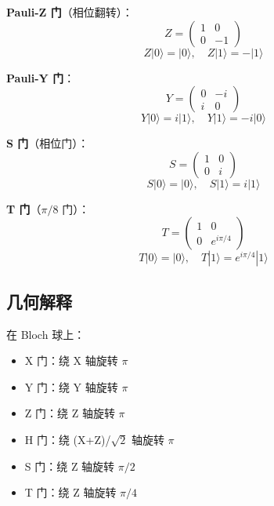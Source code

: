 \documentclass[12pt,a4paper]{article}
\begin{document}
\textbf{Pauli-Z 门}（相位翻转）：
\begin{equation}
Z = \begin{pmatrix} 1 & 0 \\ 0 & -1 \end{pmatrix}
\end{equation}
\begin{equation}
Z|0\rangle = |0\rangle, \quad Z|1\rangle = -|1\rangle
\end{equation}

\textbf{Pauli-Y 门}：
\begin{equation}
Y = \begin{pmatrix} 0 & -i \\ i & 0 \end{pmatrix}
\end{equation}
\begin{equation}
Y|0\rangle = i|1\rangle, \quad Y|1\rangle = -i|0\rangle
\end{equation}

\textbf{S 门}（相位门）：
\begin{equation}
S = \begin{pmatrix} 1 & 0 \\ 0 & i \end{pmatrix}
\end{equation}
\begin{equation}
S|0\rangle = |0\rangle, \quad S|1\rangle = i|1\rangle
\end{equation}

\textbf{T 门}（$\pi/8$ 门）：
\begin{equation}
T = \begin{pmatrix} 1 & 0 \\ 0 & e^{i\pi/4} \end{pmatrix}
\end{equation}
\begin{equation}
T|0\rangle = |0\rangle, \quad T|1\rangle = e^{i\pi/4}|1\rangle
\end{equation}

\subsection{几何解释}

在 Bloch 球上：
\begin{itemize}
  \item X 门：绕 X 轴旋转 $\pi$
  \item Y 门：绕 Y 轴旋转 $\pi$
  \item Z 门：绕 Z 轴旋转 $\pi$
  \item H 门：绕 (X+Z)/$\sqrt{2}$ 轴旋转 $\pi$
  \item S 门：绕 Z 轴旋转 $\pi/2$
  \item T 门：绕 Z 轴旋转 $\pi/4$
\end{itemize}
\end{document}

